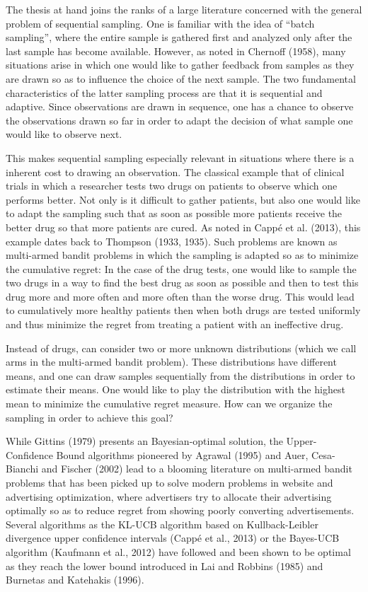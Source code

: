 \documentclass[11pt,]{article}
\begin{document}
The thesis at hand joins the ranks of a large literature concerned with
the general problem of sequential sampling. One is familiar with the
idea of ``batch sampling'', where the entire sample is gathered first
and analyzed only after the last sample has become available. However,
as noted in Chernoff (1958), many situations arise in which one would
like to gather feedback from samples as they are drawn so as to
influence the choice of the next sample. The two fundamental
characteristics of the latter sampling process are that it is sequential
and adaptive. Since observations are drawn in sequence, one has a chance
to observe the observations drawn so far in order to adapt the decision
of what sample one would like to observe next.

This makes sequential sampling especially relevant in situations where
there is a inherent cost to drawing an observation. The classical
example that of clinical trials in which a researcher tests two drugs on
patients to observe which one performs better. Not only is it difficult
to gather patients, but also one would like to adapt the sampling such
that as soon as possible more patients receive the better drug so that
more patients are cured. As noted in Cappé et al. (2013), this example
dates back to Thompson (1933, 1935). Such problems are known as
multi-armed bandit problems in which the sampling is adapted so as to
minimize the cumulative regret: In the case of the drug tests, one would
like to sample the two drugs in a way to find the best drug as soon as
possible and then to test this drug more and more often and more often
than the worse drug. This would lead to cumulatively more healthy
patients then when both drugs are tested uniformly and thus minimize the
regret from treating a patient with an ineffective drug.

Instead of drugs, can consider two or more unknown distributions (which
we call arms in the multi-armed bandit problem). These distributions
have different means, and one can draw samples sequentially from the
distributions in order to estimate their means. One would like to play
the distribution with the highest mean to minimize the cumulative regret
measure. How can we organize the sampling in order to achieve this goal?

While Gittins (1979) presents an Bayesian-optimal solution, the
Upper-Confidence Bound algorithms pioneered by Agrawal (1995) and Auer,
Cesa-Bianchi and Fischer (2002) lead to a blooming literature on
multi-armed bandit problems that has been picked up to solve modern
problems in website and advertising optimization, where advertisers try
to allocate their advertising optimally so as to reduce regret from
showing poorly converting advertisements. Several algorithms as the
KL-UCB algorithm based on Kullback-Leibler divergence upper confidence
intervals (Cappé et al., 2013) or the Bayes-UCB algorithm (Kaufmann et
al., 2012) have followed and been shown to be optimal as they reach the
lower bound introduced in Lai and Robbins (1985) and Burnetas and
Katehakis (1996).
\end{document}
